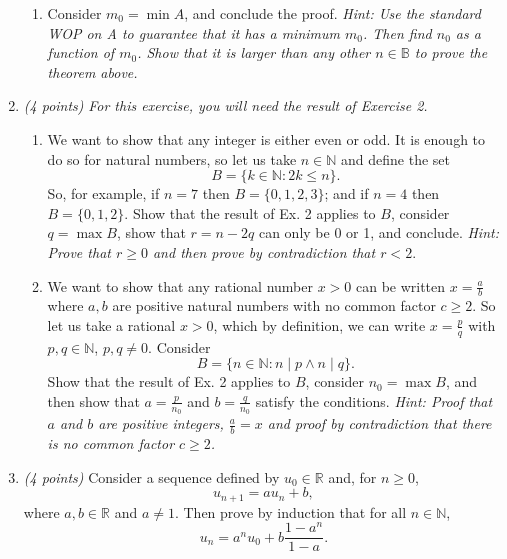 \documentclass[11pt]{article}
\begin{document}
\begin{enumerate}
\begin{enumerate}
\item Consider \(m_0 = \min A\), and conclude the proof. \newline
\emph{Hint: Use the standard WOP on A to guarantee that it has a minimum \(m_0\). Then find \(n_0\) as a function of \(m_0\). Show that it is larger than any other \(n \in \mathbb{B}\) to prove the theorem above.}\newline

\end{enumerate}


\item \emph{(4 points)} \textit{For this exercise, you will need the result of Exercise 2.}

\begin{enumerate}
\item We want to show that any integer is either even or odd. It is enough to do so for natural numbers, so let us take \(n \in \mathbb{N}\) and define the set
\[
B = \{ k \in \mathbb{N} : 2k \leq n \}.
\]
So, for example, if \( n=7 \) then \( B=\{0,1,2,3\}\); and if \(n=4\) then \( B=\{0,1,2\}\).\newline
Show that the result of Ex. 2 applies to \(B\), consider \(q = \max B\), show that \(r = n - 2q\) can only be 0 or 1, and conclude. \newline
\emph{Hint: Prove that \( r\ge 0\) and then prove by contradiction that \(r< 2\)}. \newline


\item We want to show that any rational number \(x > 0\) can be written \(x = \frac{a}{b}\) where \(a, b\) are positive natural numbers with no common factor \(c \geq 2\). So let us take a rational \(x > 0\), which by definition, we can write \(x = \frac{p}{q}\) with \(p, q \in \mathbb{N}\), \(p, q \neq 0\). Consider
\[
B = \{n \in \mathbb{N} : n \mid p \wedge n \mid q \}.
\]
Show that the result of Ex. 2 applies to \(B\), consider \(n_0 = \max B\), and then show that \(a = \frac{p}{n_0}\) and \(b = \frac{q}{n_0}\) satisfy the conditions.\newline
\emph{Hint: Proof that \(a\) and \( b\) are positive integers, \(\frac{a}{b}=x\) and proof by contradiction that there is no common factor \(c \geq 2\).}

\end{enumerate}


\item \emph{(4 points)} Consider a sequence defined by \(u_0 \in \mathbb{R}\) and, for \(n \geq 0\),
\[
u_{n+1} = a u_n + b,
\]
where \(a, b \in \mathbb{R}\) and \(a \neq 1\). Then prove by induction that for all \(n \in \mathbb{N}\),
\[
u_n = a^n u_0 + b \frac{1 - a^n}{1-a}.
\] \newline


\end{enumerate}
\newpage %
\end{document}
